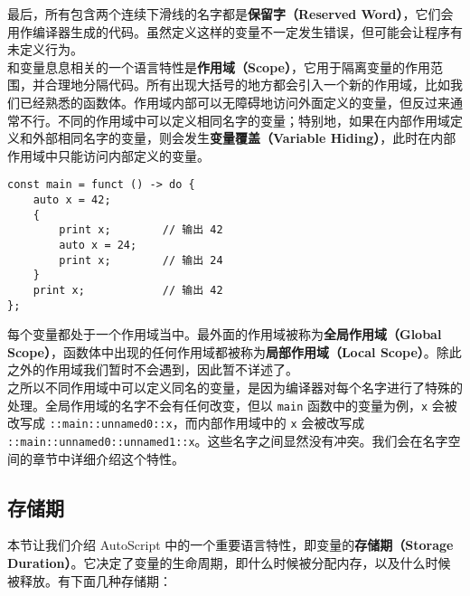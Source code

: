 最后，所有包含两个连续下滑线的名字都是\textbf{保留字（Reserved Word）}，它们会用作编译器生成的代码。虽然定义这样的变量不一定发生错误，但可能会让程序有未定义行为。 \\

和变量息息相关的一个语言特性是\textbf{作用域（Scope）}，它用于隔离变量的作用范围，并合理地分隔代码。所有出现大括号的地方都会引入一个新的作用域，比如我们已经熟悉的函数体。作用域内部可以无障碍地访问外面定义的变量，但反过来通常不行。不同的作用域中可以定义相同名字的变量；特别地，如果在内部作用域定义和外部相同名字的变量，则会发生\textbf{变量覆盖（Variable Hiding）}，此时在内部作用域中只能访问内部定义的变量。

\begin{minipage}[c]{0.95\textwidth}
\begin{lstlisting}
const main = funct () -> do {
    auto x = 42;
    {
        print x;        // 输出 42
        auto x = 24;
        print x;        // 输出 24
    }
    print x;            // 输出 42
};
\end{lstlisting}
\end{minipage}


每个变量都处于一个作用域当中。最外面的作用域被称为\textbf{全局作用域（Global Scope）}，函数体中出现的任何作用域都被称为\textbf{局部作用域（Local Scope）}。除此之外的作用域我们暂时不会遇到，因此暂不详述了。 \\

之所以不同作用域中可以定义同名的变量，是因为编译器对每个名字进行了特殊的处理。全局作用域的名字不会有任何改变，但以 \lstinline!main! 函数中的变量为例，\lstinline!x! 会被改写成 \lstinline!::main::unnamed0::x!，而内部作用域中的 \lstinline!x! 会被改写成 \lstinline!::main::unnamed0::unnamed1::x!。这些名字之间显然没有冲突。我们会在名字空间的章节中详细介绍这个特性。

\subsection{存储期}

本节让我们介绍 AutoScript 中的一个重要语言特性，即变量的\textbf{存储期（Storage Duration）}。它决定了变量的生命周期，即什么时候被分配内存，以及什么时候被释放。有下面几种存储期：

